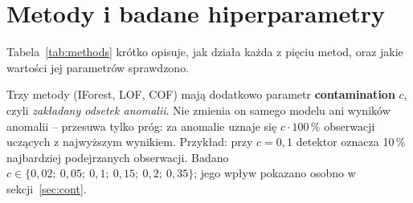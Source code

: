 \documentclass[11pt,a4paper]{article}
\begin{document}
\FloatBarrier
\section{Metody i badane hiperparametry}
\label{sec:methods}

Tabela~\ref{tab:methods} krótko opisuje, jak działa każda z pięciu metod,
oraz jakie wartości jej parametrów sprawdzono.

Trzy metody (IForest, LOF, COF) mają dodatkowo parametr \textbf{contamination}
$c$, czyli \emph{zakładany odsetek anomalii}. Nie zmienia on samego modelu ani
wyników anomalii -- przesuwa tylko próg: za anomalie uznaje się $c\cdot100\,\%$
obserwacji uczących z najwyższym wynikiem. Przykład: przy $c=0{,}1$ detektor
oznacza 10\,\% najbardziej podejrzanych obserwacji. Badano
$c\in\{0{,}02;\ 0{,}05;\ 0{,}1;\ 0{,}15;\ 0{,}2;\ 0{,}35\}$; jego wpływ
pokazano osobno w sekcji~\ref{sec:cont}.
\end{document}

